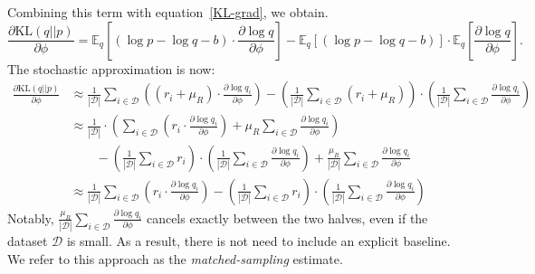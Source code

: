 \documentclass{article} %
\def\KL{\text{KL}}
\begin{document}
Combining this term with equation~\ref{KL-grad}, we obtain.
\begin{equation}
\frac{\partial \KL (q || p)}{\partial \phi} = \mathbb{E}_{q} \left[ \left( \log p - \log q - b \right) \cdot \frac{ \partial \log q}{\partial \phi} \right] 
- \mathbb{E}_{q} \left[ \left( \log p - \log q - b \right) \right] \cdot \mathbb{E}_{q} \left[ \frac{ \partial \log q}{\partial \phi} \right].
\label{matched-sampling}
\end{equation}
The stochastic approximation is now:
\begin{align}
\frac{\partial \KL(q||p)}{\partial \phi}  &\approx 
\frac{1}{|\mathcal{D}|} \sum_{i \in \mathcal{D}} \left( \left(r_i + \mu_R\right) \cdot \frac{\partial \log q_i}{\partial \phi} \right) - \left( \frac{1}{|\mathcal{D}|} \sum_{i \in \mathcal{D}} (r_i + \mu_R) \right) \cdot \left( \frac{1}{|\mathcal{D}|} \sum_{i \in \mathcal{D}} \frac{\partial \log q_i}{\partial \phi} \right) \nonumber \\
&\approx \frac{1}{|\mathcal{D}|} \cdot \left( \sum_{i \in \mathcal{D}}\left(r_i \cdot \frac{\partial \log q_i}{\partial \phi} \right) +  \mu_R \sum_{i \in \mathcal{D}} \frac{\partial \log q_i}{\partial \phi} \right) \nonumber \\
&\qquad - \left( \frac{1}{|\mathcal{D}|} \sum_{i \in \mathcal{D}} r_i \right) \cdot \left( \frac{1}{|\mathcal{D}|} \sum_{i \in \mathcal{D}} \frac{\partial \log q_i}{\partial \phi} \right) + \frac{\mu_R}{|\mathcal{D}|} \sum_{i \in \mathcal{D}} \frac{\partial \log q_i}{\partial \phi}  \nonumber \\
&\approx \frac{1}{|\mathcal{D}|} \sum_{i \in \mathcal{D}}\left( r_i \cdot \frac{\partial \log q_i}{\partial \phi} \right) - \left( \frac{1}{|\mathcal{D}|} \sum_{i \in \mathcal{D}} r_i \right) \cdot \left( \frac{1}{|\mathcal{D}|} \sum_{i \in \mathcal{D}} \frac{\partial \log q_i}{\partial \phi} \right) \label{KL-grad-matched-sampling}
\end{align}
Notably, $\frac{\mu_R}{|\mathcal{D}|} \sum_{i \in \mathcal{D}} \frac{\partial \log q_i}{\partial \phi}$ cancels exactly between the two halves, even if the dataset $\mathcal{D}$ is small.  As a result, there is not need to include an explicit baseline.  We refer to this approach as the \emph{matched-sampling} estimate.
\end{document}
